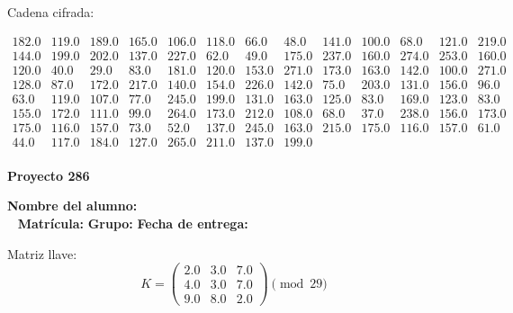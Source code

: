 \documentclass[12pt]{article}
\begin{document}
Cadena cifrada:
\begin{center}
$\begin{array}{lllllllllllll}
182.0 & 119.0 & 189.0 & 165.0 & 106.0 & 118.0 & 66.0 & 48.0 & 141.0 & 100.0 & 68.0 & 121.0 & 219.0\\
144.0 & 199.0 & 202.0 & 137.0 & 227.0 & 62.0 & 49.0 & 175.0 & 237.0 & 160.0 & 274.0 & 253.0 & 160.0\\
120.0 & 40.0 & 29.0 & 83.0 & 181.0 & 120.0 & 153.0 & 271.0 & 173.0 & 163.0 & 142.0 & 100.0 & 271.0\\
128.0 & 87.0 & 172.0 & 217.0 & 140.0 & 154.0 & 226.0 & 142.0 & 75.0 & 203.0 & 131.0 & 156.0 & 96.0\\
63.0 & 119.0 & 107.0 & 77.0 & 245.0 & 199.0 & 131.0 & 163.0 & 125.0 & 83.0 & 169.0 & 123.0 & 83.0\\
155.0 & 172.0 & 111.0 & 99.0 & 264.0 & 173.0 & 212.0 & 108.0 & 68.0 & 37.0 & 238.0 & 156.0 & 173.0\\
175.0 & 116.0 & 157.0 & 73.0 & 52.0 & 137.0 & 245.0 & 163.0 & 215.0 & 175.0 & 116.0 & 157.0 & 61.0\\
44.0 & 117.0 & 184.0 & 127.0 & 265.0 & 211.0 & 137.0 & 199.0\\
\end{array}$
\end{center}

\newpage


\textbf{Proyecto 286}

\textbf{Nombre del alumno:} \underline{\hspace{13cm}}\\\
\vspace{1cm}
\textbf{Matrícula:} \underline{\hspace{4cm}} \hspace{1cm}
\textbf{Grupo:} \underline{\hspace{2cm}}
\textbf{Fecha de entrega:} \underline{\hspace{2cm}}

\medskip

Matriz llave:
\[
K = \begin{pmatrix}
2.0 & 3.0 & 7.0\\
4.0 & 3.0 & 7.0\\
9.0 & 8.0 & 2.0
\end{pmatrix} \pmod{29}
\]
\end{document}
